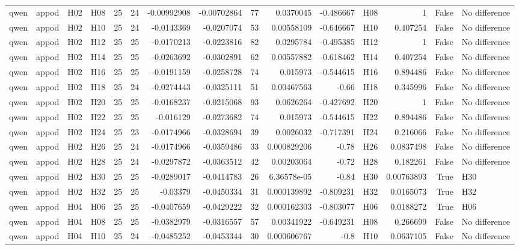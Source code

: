 \begin{longtable}{llllrrrrrrrlrrl}
qwen & appod & H02 & H08 & 25 & 24 & -0.00992908 & -0.00702864 & 77 & 0.0370045 & -0.486667 & H08 & 1 & False & No difference \\
qwen & appod & H02 & H10 & 25 & 24 & -0.0143369 & -0.0207074 & 53 & 0.00558109 & -0.646667 & H10 & 0.407254 & False & No difference \\
qwen & appod & H02 & H12 & 25 & 25 & -0.0170213 & -0.0223816 & 82 & 0.0295784 & -0.495385 & H12 & 1 & False & No difference \\
qwen & appod & H02 & H14 & 25 & 25 & -0.0263692 & -0.0302891 & 62 & 0.00557882 & -0.618462 & H14 & 0.407254 & False & No difference \\
qwen & appod & H02 & H16 & 25 & 25 & -0.0191159 & -0.0258728 & 74 & 0.015973 & -0.544615 & H16 & 0.894486 & False & No difference \\
qwen & appod & H02 & H18 & 25 & 24 & -0.0274443 & -0.0325111 & 51 & 0.00467563 & -0.66 & H18 & 0.345996 & False & No difference \\
qwen & appod & H02 & H20 & 25 & 25 & -0.0168237 & -0.0215068 & 93 & 0.0626264 & -0.427692 & H20 & 1 & False & No difference \\
qwen & appod & H02 & H22 & 25 & 25 & -0.016129 & -0.0273682 & 74 & 0.015973 & -0.544615 & H22 & 0.894486 & False & No difference \\
qwen & appod & H02 & H24 & 25 & 23 & -0.0174966 & -0.0328694 & 39 & 0.0026032 & -0.717391 & H24 & 0.216066 & False & No difference \\
qwen & appod & H02 & H26 & 25 & 24 & -0.0174966 & -0.0359486 & 33 & 0.000829206 & -0.78 & H26 & 0.0837498 & False & No difference \\
qwen & appod & H02 & H28 & 25 & 24 & -0.0297872 & -0.0363512 & 42 & 0.00203064 & -0.72 & H28 & 0.182261 & False & No difference \\
qwen & appod & H02 & H30 & 25 & 25 & -0.0289017 & -0.0414783 & 26 & 6.36578e-05 & -0.84 & H30 & 0.00763893 & True & H30 \\
qwen & appod & H02 & H32 & 25 & 25 & -0.03379 & -0.0450334 & 31 & 0.000139892 & -0.809231 & H32 & 0.0165073 & True & H32 \\
qwen & appod & H04 & H06 & 25 & 25 & -0.0407659 & -0.0429222 & 32 & 0.000162303 & -0.803077 & H06 & 0.0188272 & True & H06 \\
qwen & appod & H04 & H08 & 25 & 25 & -0.0382979 & -0.0316557 & 57 & 0.00341922 & -0.649231 & H08 & 0.266699 & False & No difference \\
qwen & appod & H04 & H10 & 25 & 24 & -0.0485252 & -0.0453344 & 30 & 0.000606767 & -0.8 & H10 & 0.0637105 & False & No difference \\

\end{longtable}
